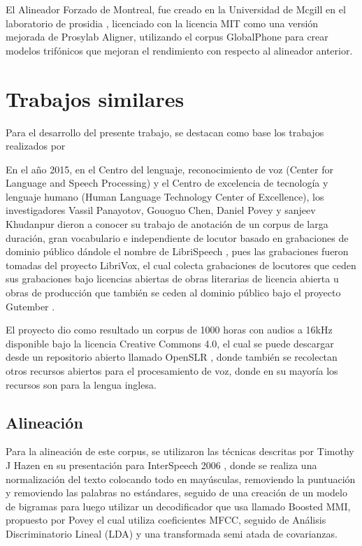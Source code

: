 El Alineador Forzado de Montreal, fue creado en la Universidad de Mcgill en el laboratorio de prosidia \cite{McAuliffe2017MontrealKaldi}, licenciado con la licencia MIT  como una versión mejorada de Prosylab Aligner, utilizando el corpus GlobalPhone  para crear modelos trifónicos que mejoran el rendimiento con respecto al alineador anterior.

\section{Trabajos similares}

Para el desarrollo del presente trabajo, se destacan como base los trabajos realizados por 

En el año 2015, en el Centro del lenguaje, reconocimiento de voz (Center for Language and Speech Processing) y el Centro de excelencia de tecnología y lenguaje humano (Human Language Technology Center of Excellence), los investigadores Vassil Panayotov, Gouoguo Chen, Daniel Povey y sanjeev Khudanpur dieron a conocer su trabajo de anotación de un corpus de larga duración, gran vocabulario e independiente de locutor basado en grabaciones de dominio público dándole el nombre de LibriSpeech \cite{PanayotovLIBRISPEECH:BOOKS}, pues las grabaciones fueron tomadas del proyecto LibriVox, el cual colecta grabaciones de locutores que ceden sus grabaciones bajo licencias abiertas de obras literarias de licencia abierta u obras de producción que también se ceden al dominio público bajo el proyecto Gutember \cite{gutenberg}.

El proyecto dio como resultado un corpus de 1000 horas con audios a 16kHz disponible bajo la licencia Creative Commons 4.0, el cual se puede descargar desde un repositorio abierto llamado OpenSLR \cite{openSLR}, donde también se recolectan otros recursos abiertos para el procesamiento de voz, donde en su mayoría los recursos son para la lengua inglesa.

\subsection{Alineación}

Para la alineación de este corpus, se utilizaron las técnicas descritas por Timothy J Hazen en su presentación para InterSpeech 2006 \cite{HazenAutomatic}, donde se realiza una normalización del texto colocando todo en mayúsculas, removiendo la puntuación y removiendo las palabras no estándares, seguido de una creación de un modelo de bigramas para luego utilizar un decodificador que usa llamado Boosted MMI, propuesto por Povey \cite{PoveyBOOSTEDTRAINING} el cual utiliza coeficientes MFCC, seguido de Análisis Discriminatorio Lineal (LDA) y una transformada semi atada de covarianzas.

